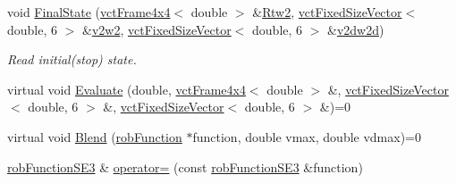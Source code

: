 \begin{DoxyCompactItemize}
void \hyperlink{classrob_function_s_e3_af7f247aa30a789651bd23b367d7f1eb7}{Final\+State} (\hyperlink{classvct_frame4x4}{vct\+Frame4x4}$<$ double $>$ \&\hyperlink{classrob_function_s_e3_a06d362ebf89c4f6a3984c4097a810a27}{Rtw2}, \hyperlink{classvct_fixed_size_vector}{vct\+Fixed\+Size\+Vector}$<$ double, 6 $>$ \&\hyperlink{classrob_function_s_e3_a9e6845bf899f02dcab9dc56d59923787}{v2w2}, \hyperlink{classvct_fixed_size_vector}{vct\+Fixed\+Size\+Vector}$<$ double, 6 $>$ \&\hyperlink{classrob_function_s_e3_ab91a09514cf4b5f4b2626ed8e44133c0}{v2dw2d})
\begin{DoxyCompactList}\small\item\em Read initial(stop) state. \end{DoxyCompactList}\item 
virtual void \hyperlink{classrob_function_s_e3_ac1f7e6113e1ed359e15290e09df9e012}{Evaluate} (double, \hyperlink{classvct_frame4x4}{vct\+Frame4x4}$<$ double $>$ \&, \hyperlink{classvct_fixed_size_vector}{vct\+Fixed\+Size\+Vector}$<$ double, 6 $>$ \&, \hyperlink{classvct_fixed_size_vector}{vct\+Fixed\+Size\+Vector}$<$ double, 6 $>$ \&)=0
\item 
virtual void \hyperlink{classrob_function_s_e3_a2778648e88046019c07c703b8e808e8e}{Blend} (\hyperlink{classrob_function}{rob\+Function} $\ast$function, double vmax, double vdmax)=0
\item 
\hyperlink{classrob_function_s_e3}{rob\+Function\+S\+E3} \& \hyperlink{classrob_function_s_e3_a8bf41748f306c77e2babbba445e157c5}{operator=} (const \hyperlink{classrob_function_s_e3}{rob\+Function\+S\+E3} \&function)
\end{DoxyCompactItemize}
